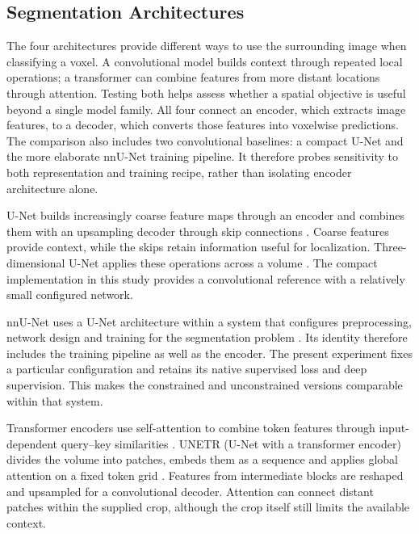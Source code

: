 \documentclass[12pt,a4paper]{article}
\begin{document}
\subsection{Segmentation Architectures}\label{sec:segmentation-architectures}

The four architectures provide different ways to use the surrounding
image when classifying a voxel. A convolutional model builds context
through repeated local operations; a transformer can combine features
from more distant locations through attention. Testing both helps assess
whether a spatial objective is useful beyond a single model family.
All four connect an encoder, which extracts image features, to a decoder,
which converts those features into voxelwise predictions. The comparison
also includes two convolutional baselines: a compact U-Net and the more
elaborate nnU-Net training pipeline. It therefore probes sensitivity to
both representation and training recipe, rather than isolating encoder
architecture alone.

U-Net builds increasingly coarse feature maps through an encoder and
combines them with an upsampling decoder through skip connections
\cite{ronneberger2015unet}. Coarse features provide context, while the
skips retain information useful for localization. Three-dimensional
U-Net applies these operations across a volume \cite{cicek2016unet}.
The compact implementation in this study provides a convolutional
reference with a relatively small configured network.

nnU-Net uses a U-Net architecture within a system that configures
preprocessing, network design and training for the segmentation problem
\cite{isensee2021nnunet}. Its identity therefore includes the training
pipeline as well as the encoder. The present experiment fixes a particular
configuration and retains its native supervised loss and deep supervision.
This makes the constrained and unconstrained versions comparable within
that system.

Transformer encoders use self-attention to combine token features through
input-dependent query--key similarities \cite{vaswani2017attention}.
UNETR (U-Net with a transformer encoder) divides the volume into
patches, embeds them as a sequence and
applies global attention on a fixed token grid
\cite{hatamizadeh2021unetr}. Features from intermediate blocks are
reshaped and upsampled for a convolutional decoder. Attention can connect
distant patches within the supplied crop, although the crop itself still
limits the available context.
\end{document}
